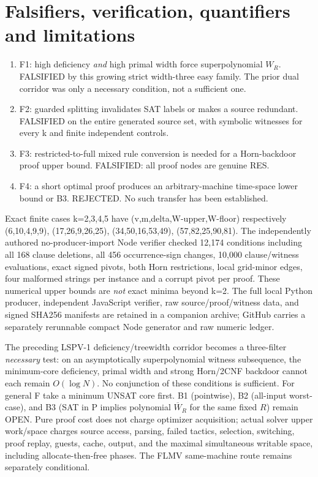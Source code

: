 \documentclass[11pt]{article}
\begin{document}
\section*{Falsifiers, verification, quantifiers and limitations}
\begin{enumerate}
\item[] F1: high deficiency \emph{and} high primal width force superpolynomial $W_R$. FALSIFIED by this growing strict width-three easy family. The prior dual corridor was only a necessary condition, not a sufficient one.
\item[] F2: guarded splitting invalidates SAT labels or makes a source redundant. FALSIFIED on the entire generated source set, with symbolic witnesses for every k and finite independent controls.
\item[] F3: restricted-to-full mixed rule conversion is needed for a Horn-backdoor proof upper bound. FALSIFIED: all proof nodes are genuine RES.
\item[] F4: a short optimal proof produces an arbitrary-machine time-space lower bound or B3. REJECTED. No such transfer has been established.
\end{enumerate}
Exact finite cases k=2,3,4,5 have (v,m,delta,W-upper,W-floor) respectively
(6,10,4,9,9), (17,26,9,26,25), (34,50,16,53,49), (57,82,25,90,81).
The independently authored no-producer-import Node verifier checked 12,174 conditions including all 168 clause deletions, all 456 occurrence-sign changes, 10,000 clause/witness evaluations, exact signed pivots, both Horn restrictions, local grid-minor edges, four malformed strings per instance and a corrupt pivot per proof. These numerical upper bounds are \emph{not} exact minima beyond k=2. The full local Python producer, independent JavaScript verifier, raw source/proof/witness data, and signed SHA256 manifests are retained in a companion archive; GitHub carries a separately rerunnable compact Node generator and raw numeric ledger.

The preceding LSPV-1 deficiency/treewidth corridor becomes a three-filter \emph{necessary} test: on an asymptotically superpolynomial witness subsequence, the minimum-core deficiency, primal width and strong Horn/2CNF backdoor cannot each remain $O(\log N)$. No conjunction of these conditions is sufficient. For general F take a minimum UNSAT core first. B1 (pointwise), B2 (all-input worst-case), and B3 (SAT in P implies polynomial $\overline W_R$ for the same fixed $R$) remain OPEN. Pure proof cost does not charge optimizer acquisition; actual solver upper work/space charges source access, parsing, failed tactics, selection, switching, proof replay, guests, cache, output, and the maximal simultaneous writable space, including allocate-then-free phases. The FLMV same-machine route remains separately conditional.
\end{document}
